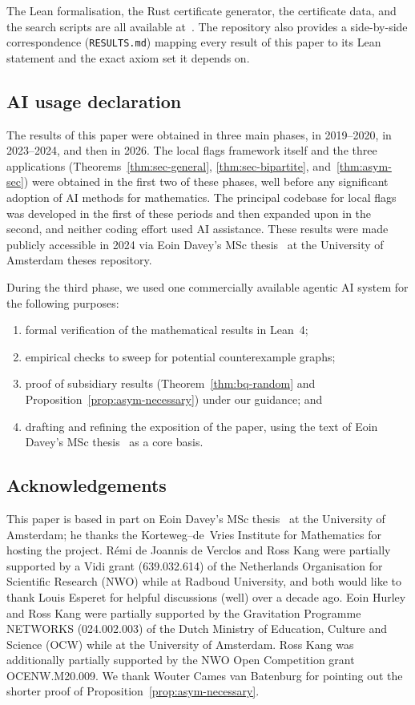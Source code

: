 \documentclass[11pt,a4paper]{article}
\theoremstyle{definition}
\theoremstyle{remark}
\begin{document}
The Lean formalisation, the Rust
certificate generator, the certificate data, and the search
scripts are all available at~\cite{daveyLocalFlags2024Repo}. The
repository also provides a side-by-side correspondence
(\texttt{RESULTS.md}) mapping every result of this paper to its Lean
statement and the exact axiom set it depends on.


\subsection*{AI usage declaration}
\label{sec:AI-usage}

The results of this paper were obtained in three main phases, in 2019--2020, in 2023--2024, and then in 2026.
The local flags framework itself and the three applications (Theorems~\ref{thm:sec-general}, \ref{thm:sec-bipartite}, and~\ref{thm:asym-sec}) were obtained in the first two of these phases, well before any significant adoption of AI methods for mathematics.
The principal codebase for local flags was developed in the first of these periods and then expanded upon in the second, and neither coding effort used AI assistance.
These results were made publicly accessible in 2024 via Eoin Davey's MSc thesis~\cite{daveyLocalFlags2024} at the University of Amsterdam theses repository.

During the third phase, we used one commercially available agentic AI system for the following purposes:
\begin{enumerate}
\item formal verification of the mathematical results in Lean~4;
\item empirical checks to sweep for potential counterexample graphs;
\item proof of subsidiary results (Theorem~\ref{thm:bq-random} and Proposition~\ref{prop:asym-necessary}) under our guidance; and
\item drafting and refining the exposition of the paper, using the text of Eoin Davey's MSc thesis~\cite{daveyLocalFlags2024} as a core basis.
\end{enumerate}

\subsection*{Acknowledgements}

This paper is based in part on Eoin Davey's MSc
thesis~\cite{daveyLocalFlags2024} at the University of Amsterdam;
he thanks the Korteweg--de~Vries Institute for Mathematics for
hosting the project. R\'emi de Joannis de Verclos and Ross Kang
were partially supported by a Vidi grant (639.032.614) of the
Netherlands Organisation for Scientific Research (NWO) while at
Radboud University, and both would like to thank Louis Esperet for helpful discussions (well) over a decade ago. Eoin Hurley and Ross Kang were partially
supported by the Gravitation Programme NETWORKS (024.002.003) of
the Dutch Ministry of Education, Culture and Science (OCW) while at the University of Amsterdam. Ross Kang
was additionally partially supported by the NWO Open Competition
grant OCENW.M20.009.
We thank Wouter Cames van Batenburg for pointing out the shorter proof of Proposition~\ref{prop:asym-necessary}.
\end{document}
